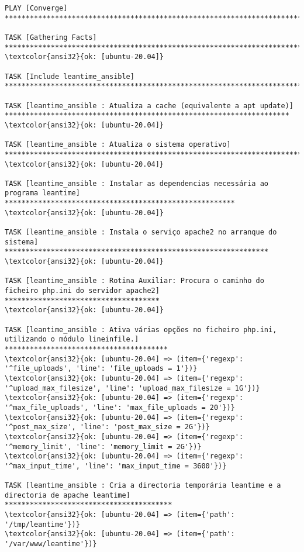 \documentclass{scrartcl}
\begin{document}
\begin{Verbatim}
PLAY [Converge] **************************************************************************************************************************

TASK [Gathering Facts] *******************************************************************************************************************
\textcolor{ansi32}{ok: [ubuntu-20.04]}

TASK [Include leantime_ansible] **********************************************************************************************************

TASK [leantime_ansible : Atualiza a cache (equivalente a apt update)] ********************************************************************
\textcolor{ansi32}{ok: [ubuntu-20.04]}

TASK [leantime_ansible : Atualiza o sistema operativo] ***********************************************************************************
\textcolor{ansi32}{ok: [ubuntu-20.04]}

TASK [leantime_ansible : Instalar as dependencias necessária ao programa leantime] *******************************************************
\textcolor{ansi32}{ok: [ubuntu-20.04]}

TASK [leantime_ansible : Instala o serviço apache2 no arranque do sistema] ***************************************************************
\textcolor{ansi32}{ok: [ubuntu-20.04]}

TASK [leantime_ansible : Rotina Auxiliar: Procura o caminho do ficheiro php.ini do servidor apache2] *************************************
\textcolor{ansi32}{ok: [ubuntu-20.04]}

TASK [leantime_ansible : Ativa várias opções no ficheiro php.ini, utilizando o módulo lineinfile.] ***************************************
\textcolor{ansi32}{ok: [ubuntu-20.04] => (item={'regexp': '^file_uploads', 'line': 'file_uploads = 1'})}
\textcolor{ansi32}{ok: [ubuntu-20.04] => (item={'regexp': '^upload_max_filesize', 'line': 'upload_max_filesize = 1G'})}
\textcolor{ansi32}{ok: [ubuntu-20.04] => (item={'regexp': '^max_file_uploads', 'line': 'max_file_uploads = 20'})}
\textcolor{ansi32}{ok: [ubuntu-20.04] => (item={'regexp': '^post_max_size', 'line': 'post_max_size = 2G'})}
\textcolor{ansi32}{ok: [ubuntu-20.04] => (item={'regexp': '^memory_limit', 'line': 'memory_limit = 2G'})}
\textcolor{ansi32}{ok: [ubuntu-20.04] => (item={'regexp': '^max_input_time', 'line': 'max_input_time = 3600'})}

TASK [leantime_ansible : Cria a directoria temporária leantime e a directoria de apache leantime] ****************************************
\textcolor{ansi32}{ok: [ubuntu-20.04] => (item={'path': '/tmp/leantime'})}
\textcolor{ansi32}{ok: [ubuntu-20.04] => (item={'path': '/var/www/leantime'})}


\end{Verbatim}
\end{document}
